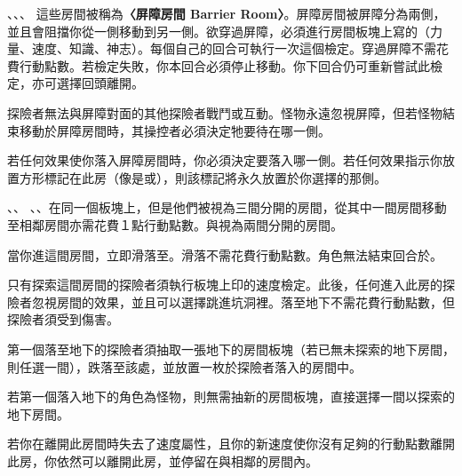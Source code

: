 \begin{RuleBox}{、、、}
	這些房間被稱為\textbf{〈屏障房間 Barrier Room〉}。屏障房間被屏障分為兩側，並且會阻擋你從一側移動到另一側。欲穿過屏障，必須進行房間板塊上寫的\textbf{}（力量、速度、知識、神志）。每個自己的回合可執行一次這個檢定。穿過屏障不需花費行動點數。若檢定失敗，你本回合必須停止移動。你下回合仍可重新嘗試此檢定，亦可選擇回頭離開。

	探險者無法與屏障對面的其他探險者戰鬥或互動。怪物永遠忽視屏障，但若怪物結束移動於屏障房間時，其操控者必須決定牠要待在哪一側。

	若任何效果使你落入屏障房間時，你必須決定要落入哪一側。若任何效果指示你放置方形標記在此房（像是或），則該標記將永久放置於你選擇的那側。
\end{RuleBox}

\begin{RuleBox}{、、}
	、、在同一個板塊上，但是他們被視為三間分開的房間，從其中一間房間移動至相鄰房間亦需花費１點行動點數。與視為兩間分開的房間。
\end{RuleBox}

\begin{RuleBox}{}
	當你進這間房間，立即滑落至。滑落不需花費行動點數。角色無法結束回合於。
\end{RuleBox}

\begin{RuleBox}{}
	只有探索這間房間的探險者須執行板塊上印的速度檢定。此後，任何進入此房的探險者忽視房間的效果，並且可以選擇跳進坑洞裡。落至地下不需花費行動點數，但探險者須受到傷害。

	第一個落至地下的探險者須抽取一張地下的房間板塊（若已無未探索的地下房間，則任選一間），跌落至該處，並放置一枚於探險者落入的房間中。

	若第一個落入地下的角色為怪物，則無需抽新的房間板塊，直接選擇一間以探索的地下房間。
\end{RuleBox}

\begin{RuleBox}{}
	若你在離開此房間時失去了速度屬性，且你的新速度使你沒有足夠的行動點數離開此房，你依然可以離開此房，並停留在與相鄰的房間內。
\end{RuleBox}

